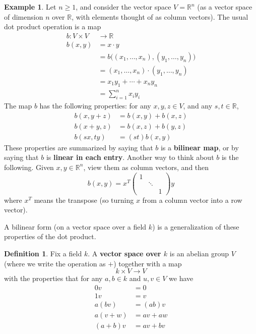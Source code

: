 \documentclass[12pt]{article}
\theoremstyle{definition}
\newtheorem{definition}[theorem]{Definition}
\newtheorem{example}[theorem]{Example}
\newcommand{\R}{\mathbb{R}}
\newcommand{\tbf}{\textbf}
\newcommand{\noi}{\noindent}
\begin{document}
\begin{example}
Let $n \ge 1$, and consider the vector space $V = \R^n$ (as a vector space of dimension $n$ over $\R$, with elements thought of as column vectors). The usual dot product operation is a map
\begin{align*}
	b: V \times V &\to \R \\
	 b(x, y) &= x \cdot y \\
	&= b \Big( (x_1, \ldots, x_n) , (y_1, \ldots, y_n) \Big) \\
	&= (x_1, \ldots, x_n) \cdot (y_1, \ldots, y_n)   \\
	&= x_1 y_1 + \cdots + x_n y_n \\
	&= \sum_{i=1}^n x_i y_i
\end{align*}
The map $b$ has the following properties: for any $x, y, z \in V$, and any $s, t \in \R$,
\begin{align*}
	b( x,  y +  z) &= b(  x,  y) + b( x,  z) \\
	b( x +  y,  z) &= b( x,  z) + b( y,  z) \\
	b(s  x, t  y) &= (st) b( x,  y)
\end{align*}
These properties are summarized by saying that $b$ is a \tbf{bilinear map}, or by saying that $b$ is \tbf{linear in each entry}. Another way to think about $b$ is the following. Given $ x,  y \in \R^n$, view them as column vectors, and then 
\[
	b( x,  y) =  x^T
	\begin{pmatrix}
		1 \\
		& \ddots \\
		&& 1
	\end{pmatrix}
	  y
\]
where $ x^T$ means the transpose (so turning $ x$ from a column vector into a row vector).
\end{example}

\noi A bilinear form (on a vector space over a field $k$) is a generalization of these properties of the dot product.

\begin{definition}
Fix a field $k$. A \tbf{vector space over $k$} is an abelian group $V$ (where we write the operation as $+$) together with a map
\[
	k \times V \to V
\]
with the properties that for any $a,b \in k$ and $u,v \in V$ we have
\begin{align*}
	0v &= 0 \\
	1v &= v \\
	a(bv) &= (ab)v \\
	a(v+w) &= av + aw \\
	(a+b)v &= av + bv
\end{align*}
\end{definition}
\end{document}
